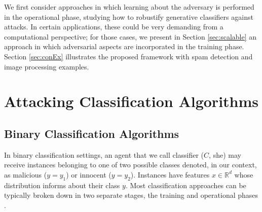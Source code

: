 We first consider approaches in which learning about the adversary is performed in the
operational phase, studying how to robustify generative classifiers against attacks. In certain applications, these  could be very demanding from a computational perspective; for those cases, we present in Section \ref{sec:scalable} an  
approach in which adversarial aspects are incorporated in the training phase.
Section \ref{sec:conEx} illustrates the proposed framework
with spam detection and image processing examples.

\section{Attacking Classification Algorithms}\label{sec:ac_acr}

\subsection{Binary Classification Algorithms}\label{sec2.1}

In binary classification settings, an agent that we call classifier ($C$, she)
may receive instances belonging to one of two possible  classes denoted, in our context, as malicious ($y=y_1$) or innocent ($y=y_2$).  Instances have  features $x \in \mathbb{R}^d$ whose distribution informs about their class $y$.  Most classification approaches can be typically broken down in two separate stages, the training and operational phases \parencite{bishop2006pattern}.
%
%

